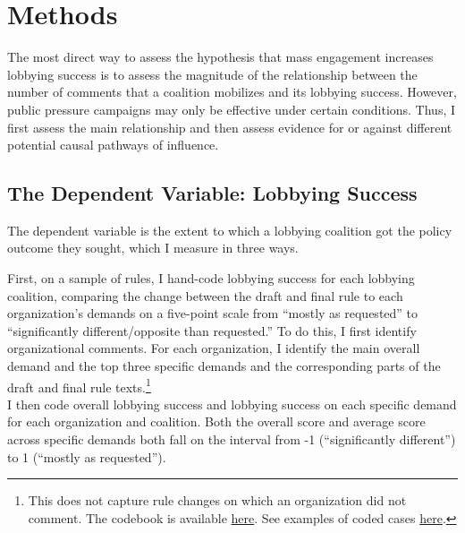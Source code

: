 \documentclass[
]{book}
\begin{document}
\hypertarget{methods}{%
\section{Methods}\label{methods}}

The most direct way to assess the hypothesis that mass engagement increases lobbying success is to assess the magnitude of the relationship between the number of comments that a coalition mobilizes and its lobbying success. However, public pressure campaigns may only be effective under certain conditions. Thus, I first assess the main relationship and then assess evidence for or against different potential causal pathways of influence.

\hypertarget{the-dependent-variable-lobbying-success}{%
\subsection{The Dependent Variable: Lobbying Success}\label{the-dependent-variable-lobbying-success}}

The dependent variable is the extent to which a lobbying coalition got the policy outcome they sought, which I measure in three ways.

First, on a sample of rules, I hand-code lobbying success for each lobbying coalition, comparing the change between the draft and final rule to each organization's demands on a five-point scale from ``mostly as requested'' to ``significantly different/opposite than requested.''
To do this, I first identify organizational comments.
For each organization, I identify the main overall demand and the top three specific demands and the corresponding parts of the draft and final rule texts.\footnote{This does not capture rule changes on which an organization did not comment.
  The codebook is available \href{https://docs.google.com/document/d/1o1hi0z9O-G9xsgkspOFG2VWzh0wQKjiezzoVpItaCxU/edit?usp=sharing}{here}. See examples of coded cases \href{https://judgelord.github.io/dissertation/influence_coding_examples.pdf}{here}.}\\
I then code overall lobbying success and lobbying success on each specific demand for each organization and coalition. Both the overall score and average score across specific demands both fall on the interval from -1 (``significantly different'') to 1 (``mostly as requested'').
\end{document}
